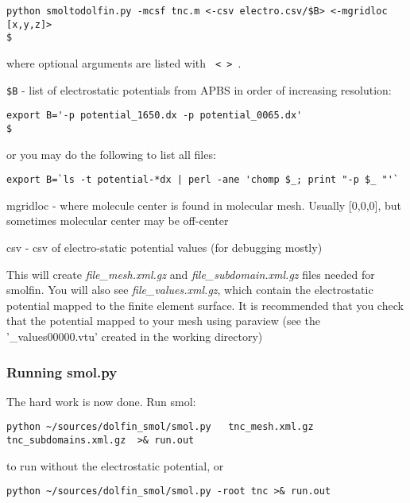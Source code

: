 \documentclass{article}
\begin{document}
\begin{verbatim}
python smoltodolfin.py -mcsf tnc.m <-csv electro.csv/$B> <-mgridloc [x,y,z]>  
$
\end{verbatim}

where optional arguments are listed with \verb! < > !.  
\lbi
\item \verb!$B! - list of electrostatic potentials from APBS in order of increasing resolution:
\begin{verbatim}
export B='-p potential_1650.dx -p potential_0065.dx'
$
\end{verbatim}
or you may do the following to list all files:
\begin{verbatim}
export B=`ls -t potential-*dx | perl -ane 'chomp $_; print "-p $_ "'`
\end{verbatim}

\item mgridloc - where molecule center is found in molecular mesh. Usually [0,0,0], but sometimes molecular center may be off-center 
\item csv - csv of electro-static potential values  (for debugging mostly)
\lei


This will create \textit{file\_mesh.xml.gz}  and
\textit{file\_subdomain.xml.gz} files needed for smolfin. You will also
see \textit{file\_values.xml.gz}, which contain the electrostatic potential mapped to the finite element surface. It is recommended that you check that the potential mapped to your mesh using paraview
(see the '\_values00000.vtu' created in the working directory)


\subsubsection{Running smol.py}
\label{runme}
The hard work is now done. Run smol: 

\begin{verbatim}
python ~/sources/dolfin_smol/smol.py   tnc_mesh.xml.gz tnc_subdomains.xml.gz  >& run.out 
\end{verbatim}
to run without the electrostatic potential, or 

\begin{verbatim}
python ~/sources/dolfin_smol/smol.py -root tnc >& run.out 
\end{verbatim}
\end{document}
